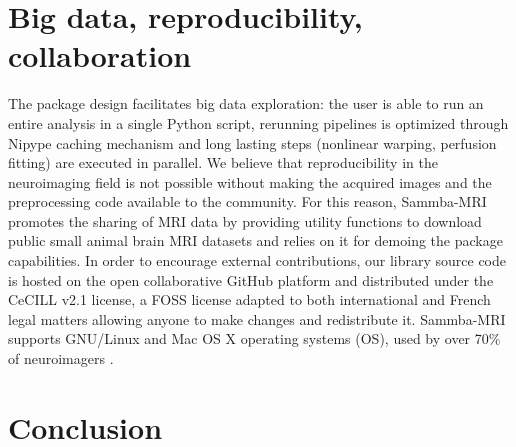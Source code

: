 \documentclass[utf8, a4paper, final, crop]{frontiersSCNS}
\begin{document}
\section{Big data, reproducibility, collaboration}
The package design facilitates big data exploration: the user is able to run an 
entire analysis in a single Python script, rerunning pipelines is optimized 
through Nipype caching mechanism and long lasting steps (nonlinear warping, perfusion 
fitting) are executed in parallel.
%
We believe that reproducibility in the neuroimaging field is not possible without
making the acquired images and the preprocessing code available to the community.
%
For this reason, Sammba-MRI promotes the sharing of MRI data by providing 
utility functions to download public small animal brain MRI 
datasets and relies on it for demoing the package capabilities.
In order to encourage external contributions, our library source code is hosted on the open 
collaborative GitHub platform
and distributed under the CeCILL v2.1 license, a FOSS license adapted to both international and French legal matters 
allowing anyone to make changes and redistribute it. 
Sammba-MRI supports GNU/Linux and Mac OS X operating systems (OS), used by over 70\% 
of neuroimagers \citep{hanke2011neuroscience}. 



%
%
%
%


\section{Conclusion}
\end{document}

